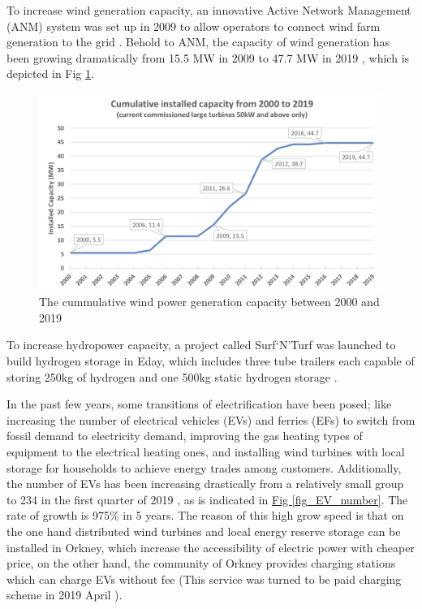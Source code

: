 \documentclass[12pt,a4paper]{report}
\begin{document}
        To increase wind generation capacity, an innovative Active Network Management (ANM) system was set up in 2009 to allow operators to connect wind farm generation to the grid \cite{website:ANM}. 
        Behold to ANM, the capacity of wind generation has been growing dramatically from 15.5 MW in 2009 to 47.7 MW in 2019 \cite{report:OrkneyAudit}, which is depicted in Fig \ref{fig_cummulative_wind_capacity}. 
        
        \begin{figure}[ht]
            \centerline{\includegraphics[scale=1]{cummulativewindcapacity}}
            \caption{The cummulative wind power generation capacity between 2000 and 2019}
            \label{fig_cummulative_wind_capacity}
        \end{figure}

        To increase hydropower capacity, a project called Surf`N'Turf was launched to build hydrogen storage in Eday, 
        which includes three tube trailers each capable of storing 250kg of hydrogen and one 500kg static hydrogen storage \cite{website:surfturf}. 

        In the past few years, some transitions of electrification have been posed; 
        like increasing the number of electrical vehicles (EVs) and ferries (EFs) to switch 
        from fossil demand to electricity demand, improving the gas heating types of 
        equipment to the electrical heating ones, and installing wind turbines with local 
        storage for households to achieve energy trades among customers. 
        Additionally, the number of EVs has been increasing drastically from a relatively small group to 234 in the first quarter of 2019 \cite{report:OrkneyAudit}, as is indicated in \hyperref[fig_EV_number]{Fig \ref*{fig_EV_number}}.
        The rate of growth is 975\% in 5 years. The reason of this high grow speed is that on the one hand distributed wind turbines and local energy reserve storage can be installed in Orkney, which increase the accessibility of electric power with cheaper price, on the other hand, the community of Orkney provides charging stations which can charge EVs without fee (This service was turned to be paid charging scheme in 2019 April \cite{report:OrkneyAudit}).
\end{document}
